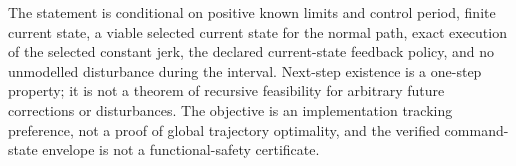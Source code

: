 The statement is conditional on positive known limits and control period,
finite current state, a viable selected current state for the normal path,
exact execution of the selected constant jerk, the declared current-state
feedback policy, and no unmodelled disturbance during the interval.
Next-step existence is a one-step property; it is not a theorem of recursive
feasibility for arbitrary future corrections or disturbances.  The objective
is an implementation tracking preference, not a proof of global trajectory
optimality, and the verified command-state envelope is not a functional-safety
certificate.

